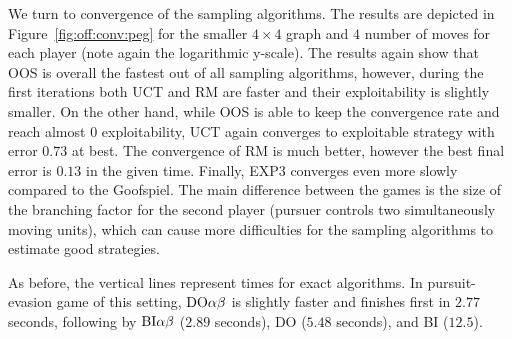 We turn to convergence of the sampling algorithms.
The results are depicted in Figure~\ref{fig:off:conv:peg} for the smaller $4\times4$ graph and $4$ number of moves for each player (note again the logarithmic y-scale).
The results again show that OOS is overall the fastest out of all sampling algorithms, however, during the first iterations both UCT and RM are faster and their exploitability is slightly smaller. 
On the other hand, while OOS is able to keep the convergence rate and reach almost $0$ exploitability, UCT again converges to exploitable strategy with error $0.73$ at best. 
The convergence of RM is much better, however the best final error is $0.13$ in the given time.
Finally, EXP3 converges even more slowly compared to the Goofspiel.
The main difference between the games is the size of the branching factor for the second player (pursuer controls two simultaneously moving units), which can cause more difficulties for the sampling algorithms to estimate good strategies.

As before, the vertical lines represent times for exact algorithms.
In pursuit-evasion game of this setting, $\textrm{DO}\alpha\beta$ is slightly faster and finishes first in $2.77$ seconds, following by $\textrm{BI}\alpha\beta$ ($2.89$ seconds), \textsc{DO} ($5.48$ seconds), and \textsc{BI} ($12.5$).

